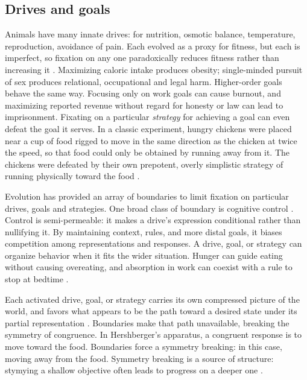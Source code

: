 \documentclass[11pt]{article}
\begin{document}


\subsection{Drives and goals} 

Animals have many innate drives: for nutrition, osmotic balance, temperature, reproduction, avoidance of pain. Each evolved as a proxy for fitness, but each is imperfect, so fixation on any one paradoxically reduces fitness rather than increasing it \citep{kurthnelson2024dynamic, john2023dead, mcfarland1975behavioural}. Maximizing caloric intake produces obesity; single-minded pursuit of sex produces relational, occupational and legal harm. Higher-order goals behave the same way. Focusing only on work goals can cause burnout, and maximizing reported revenue without regard for honesty or law can lead to imprisonment. Fixating on a particular \textit{strategy} for achieving a goal can even defeat the goal it serves. In a classic experiment, hungry chickens were placed near a cup of food rigged to move in the same direction as the chicken at twice the speed, so that food could only be obtained by running away from it. The chickens were defeated by their own prepotent, overly simplistic strategy of running physically toward the food \citep{hershberger1986approach, dayan2006misbehavior}.

Evolution has provided an array of boundaries to limit fixation on particular drives, goals and strategies. One broad class of boundary is cognitive control \citep{botvinick2001conflict, diamond2013executive}. Control is semi-permeable: it makes a drive's expression conditional rather than nullifying it. By maintaining context, rules, and more distal goals, it biases competition among representations and responses. A drive, goal, or strategy can organize behavior when it fits the wider situation. Hunger can guide eating without causing overeating, and absorption in work can coexist with a rule to stop at bedtime \citep{miller2001integrative,braver2012variable}.

Each activated drive, goal, or strategy carries its own compressed picture of the world, and favors what appears to be the path toward a desired state under its partial representation \citep{miller1960plans, carver2001self}. Boundaries make that path unavailable, breaking the symmetry of congruence. In Hershberger's apparatus, a congruent response is to move toward the food. Boundaries force a symmetry breaking: in this case, moving away from the food. Symmetry breaking is a source of structure: stymying a shallow objective often leads to progress on a deeper one \citep{anderson1972more, duncker1945on, rosenberg1969direction, stokes2005creativity, ohlsson1992information}.
\end{document}
